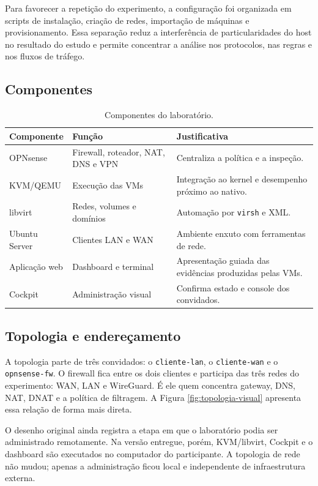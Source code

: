 \documentclass[12pt,a4paper]{article}
\begin{document}
Para favorecer a repetição do experimento, a configuração foi organizada em
scripts de instalação, criação de redes, importação de máquinas e
provisionamento. Essa separação reduz a interferência de particularidades do
host no resultado do estudo e permite concentrar a análise nos protocolos, nas
regras e nos fluxos de tráfego.

\subsection{Componentes}
\begin{table}[H]\centering
\caption{Componentes do laboratório.}\label{tab:componentes}
\begin{tabularx}{\textwidth}{P{3cm}YY}\toprule
\textbf{Componente}&\textbf{Função}&\textbf{Justificativa}\\\midrule
OPNsense&Firewall, roteador, NAT, DNS e VPN&Centraliza a política e a inspeção.\\
KVM/QEMU&Execução das VMs&Integração ao kernel e desempenho próximo ao nativo.\\
libvirt&Redes, volumes e domínios&Automação por \texttt{virsh} e XML.\\
Ubuntu Server&Clientes LAN e WAN&Ambiente enxuto com ferramentas de rede.\\
Aplicação web&Dashboard e terminal&Apresentação guiada das evidências produzidas pelas VMs.\\
Cockpit&Administração visual&Confirma estado e console dos convidados.\\\bottomrule
\end{tabularx}\end{table}

\subsection{Topologia e endereçamento}
A topologia parte de três convidados: o \texttt{cliente-lan}, o
\texttt{cliente-wan} e o \texttt{opnsense-fw}. O firewall fica entre os dois
clientes e participa das três redes do experimento: WAN, LAN e WireGuard. É ele
quem concentra gateway, DNS, NAT, DNAT e a política de filtragem. A Figura
\ref{fig:topologia-visual} apresenta essa relação de forma mais direta.

O desenho original ainda registra a etapa em que o laboratório podia ser
administrado remotamente. Na versão entregue, porém, KVM/libvirt, Cockpit e o
dashboard são executados no computador do participante. A topologia de rede não
mudou; apenas a administração ficou local e independente de infraestrutura externa.
\end{document}
